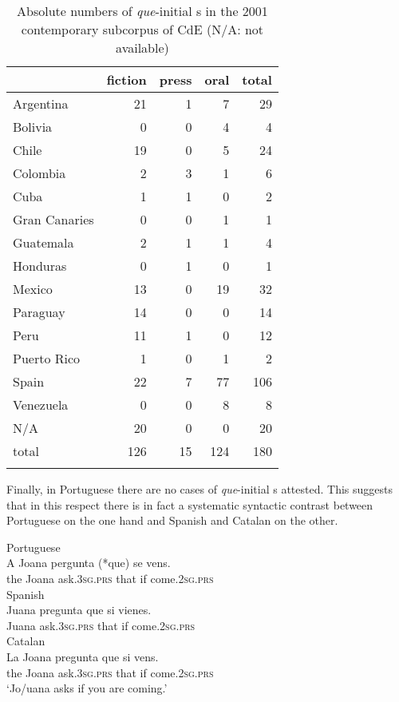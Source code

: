 \begin{table}
\begin{tabular}{l*4{r}}
	\lsptoprule
	& fiction & press & oral & total \\ 
	\midrule
	Argentina &  21 &   1 &   7 & 29 \\ 
	Bolivia &   0 &   0 &   4 &4 \\ 
	Chile&  19 &   0 &  5&  24  \\ 
	Colombia&   2 &   3 &   1 &  6\\  
	Cuba &   1 &   1 &   0 &  2\\ 
	Gran Canaries &   0 &   0 &   1 &  1 \\
	Guatemala  &   2 &   1 &   1 &  4 \\ 
	Honduras &   0 &   1 &   0 &  1\\ 
	Mexico &  13 &   0 &  19&  32 \\ 
	Paraguay &  14 &   0 &   0&  14 \\ 
	Peru  &  11 &   1 &   0 &  12\\
	Puerto Rico &   1 &   0 &   1 &  2\\  
	Spain&  22 &   7 &  77 & 106 \\
	Venezuela &   0 &   0 &   8&8 \\ 
	N/A &  20 &   0 &   0 &20 \\\midrule
	total &  126  &  15 &  124& 180\\
\lspbottomrule
\end{tabular}
	\caption{Absolute numbers of \emph{que}-initial s in the 2001 contemporary subcorpus of CdE (N/A: not available)}\label{tab:quepqsp}
\end{table}

Finally, in Portuguese there are no cases  of \emph{que}-initial s attested. This suggests that in this respect there is in fact a systematic syntactic  contrast  between Portuguese on the one hand and  Spanish and Catalan on the other.\pagebreak

\ea 
\ea\label{ex:quesia}
Portuguese\\ 
\gll  A Joana pergunta (*que) se vens. \\
the Joana ask.\textsc{3sg.prs} that if come.\textsc{2sg.prs}\\
\ex\label{ex:quesib}
		Spanish\\
\gll Juana pregunta que si vienes. \\
Juana ask.\textsc{3sg.prs} that if come.\textsc{2sg.prs}\\
\ex\label{ex:quesic}
Catalan\\
\gll La Joana pregunta que si vens. \\
the Joana ask.\textsc{3sg.prs} that if come.\textsc{2sg.prs}\\
\glt `Jo/uana asks if you are coming.'
\z
\z 


